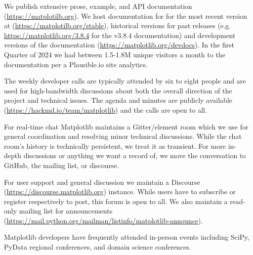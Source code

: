 \documentclass[12pt]{article}
\numberwithin{page}{section}
\begin{document}
We publish extensive prose, example, and API documentation
(\url{https://matplotilb.org}).  We host documentation for for the most recent
version at (\url{https://matplotilb.org/stable}), historical versions for past
releases (e.g. \url{https://matplotlib.org/3.8.4} for the v3.8.4 documentation)
and development versions of the documentation
(\url{https://matplotlib.org/devdocs}).  In the first Quarter of 2024 we had
between 1.5-1.8M unique visitors a month to the documentation per a
Plausible.io site analytics.

The weekly developer calls are typically attended by six to eight people and
are used for high-bandwidth discussions about both the overall direction of the
project and technical issues.  The agenda and minutes are publicly available
(\url{https://hackmd.io/team/matplotlib}) and the calls are open to all.

For real-time chat Matplotlib maintains a Gitter/element room which we use for
general coordination and resolving minor technical discussions.  While the chat
room's history is technically persistent, we treat it as transient.  For more
in-depth discussions or anything we want a record of, we move the conversation
to GitHub, the mailing list, or discourse.

For user support and general discussion we maintain a Discourse
(\url{https://discourse.matplotlib.org}) instance.  While users have to
subscribe or register respectively to post, this forum is open to all.  We also
maintain a read-only mailing list for announcements
(\url{https://mail.python.org/mailman/listinfo/matplotlib-announce}).

Matplotlib developers have frequently attended in-person events including
SciPy, PyData regional conferences, and domain science conferences.

\newpage

\def\ref@jnl#1{{\rm#1}}
\end{document}

